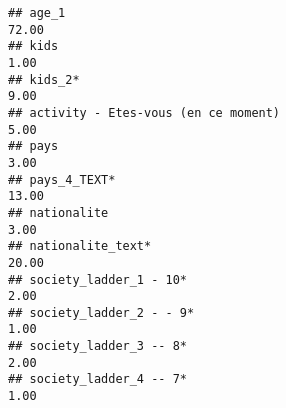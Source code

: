 \documentclass[
]{article}
\begin{document}
\begin{verbatim}
## age_1                                                                                                                                                                                                                         72.00
## kids                                                                                                                                                                                                                           1.00
## kids_2*                                                                                                                                                                                                                        9.00
## activity - Etes-vous (en ce moment)                                                                                                                                                                                            5.00
## pays                                                                                                                                                                                                                           3.00
## pays_4_TEXT*                                                                                                                                                                                                                  13.00
## nationalite                                                                                                                                                                                                                    3.00
## nationalite_text*                                                                                                                                                                                                             20.00
## society_ladder_1 - 10*                                                                                                                                                                                                         2.00
## society_ladder_2 - - 9*                                                                                                                                                                                                        1.00
## society_ladder_3 -- 8*                                                                                                                                                                                                         2.00
## society_ladder_4 -- 7*                                                                                                                                                                                                         1.00

\end{verbatim}
\end{document}
